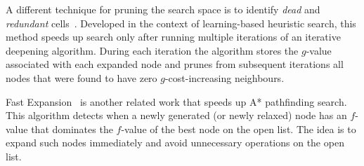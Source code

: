 A different technique for pruning the search space is to identify \emph{dead} and \emph{redundant}
cells~\citep{sturtevant10b}.  Developed in the context of learning-based heuristic search, this
method speeds up search only after running multiple iterations of an iterative deepening algorithm.
During each iteration the algorithm stores the $g$-value associated with each expanded node and
prunes from subsequent iterations all nodes that were found to have zero $g$-cost-increasing
neighbours.

Fast Expansion~\citep{sun09} is another related work that speeds up A* pathfinding search. 
This algorithm detects when a newly generated (or newly relaxed) node has an $f$-value that 
dominates the $f$-value of the best node on the open list. The idea is to expand such nodes 
immediately and avoid unnecessary operations on the open list.
